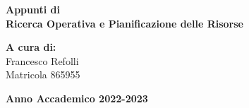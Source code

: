 \documentclass[a4paper,12pt,oneside]{book}
\begin{document}
    
    \begin{titlepage}
        
	\vspace{40mm}
        
	\begin{center}
            {\LARGE{
                    \textbf{Appunti di \\ Ricerca Operativa e Pianificazione delle Risorse}
                    \par
            }}
        \end{center}
        
        \vspace{50mm}

        \begin{flushright}
            {\large \textbf{A cura di:}} \\
            \large{Francesco Refolli} \\
            \large{Matricola 865955} 
        \end{flushright}
        
        \vspace{40mm}
        \begin{center}
            {\large{\bf Anno Accademico 2022-2023}}
        \end{center}

        \restoregeometry
        
    \end{titlepage}
    
    \printindex
    
    
    
\end{document}
